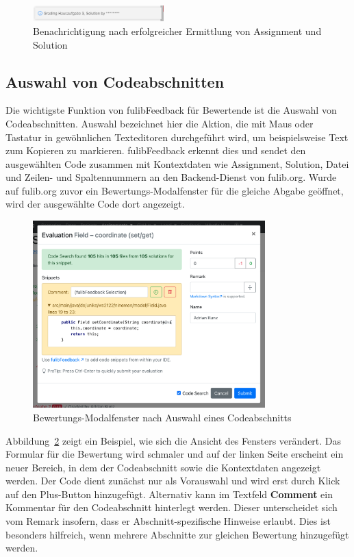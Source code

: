\begin{figure}
    \centering
    \includegraphics[width=0.45\textwidth]{images/fulibFeedback-notification}
    \caption{Benachrichtigung nach erfolgreicher Ermittlung von Assignment und Solution}
    \label{fig:fulibFeedback-notification}
\end{figure}

\subsection{Auswahl von Codeabschnitten}\label{subsec:choosing-code-snippets}

Die wichtigste Funktion von fulibFeedback für Bewertende ist die Auswahl von Codeabschnitten.
Auswahl bezeichnet hier die Aktion, die mit Maus oder Tastatur in gewöhnlichen Texteditoren durchgeführt wird, um beispielsweise Text zum Kopieren zu markieren.
fulibFeedback erkennt dies und sendet den ausgewählten Code zusammen mit Kontextdaten wie Assignment, Solution, Datei und Zeilen- und Spaltennummern an den Backend-Dienst von fulib.org.
Wurde auf fulib.org zuvor ein Bewertungs-Modalfenster für die gleiche Abgabe geöffnet, wird der ausgewählte Code dort angezeigt.

\begin{figure}
    \centering
    \includegraphics[width=0.8\textwidth]{images/fulibFeedback-snippet-good}
    \caption{Bewertungs-Modalfenster nach Auswahl eines Codeabschnitts}
    \label{fig:fulibFeedback-snippet-good}
\end{figure}

Abbildung~\ref{fig:fulibFeedback-snippet-good} zeigt ein Beispiel, wie sich die Ansicht des Fensters verändert.
Das Formular für die Bewertung wird schmaler und auf der linken Seite erscheint ein neuer Bereich, in dem der Codeabschnitt sowie die Kontextdaten angezeigt werden.
Der Code dient zunächst nur als Vorauswahl und wird erst durch Klick auf den Plus-Button hinzugefügt.
Alternativ kann im Textfeld \textbf{Comment} ein Kommentar für den Codeabschnitt hinterlegt werden.
Dieser unterscheidet sich vom Remark insofern, dass er Abschnitt-spezifische Hinweise erlaubt.
Dies ist besonders hilfreich, wenn mehrere Abschnitte zur gleichen Bewertung hinzugefügt werden.

